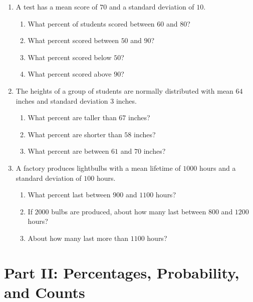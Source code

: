 \documentclass[11pt]{article}
\newcommand{\answerline}{\vspace{1.2cm}}
\begin{document}
\begin{enumerate}[leftmargin=*, label=\textbf{\arabic*.}]

\item A test has a mean score of $70$ and a standard deviation of $10$.
\begin{enumerate}[label=(\alph*)]
    \item What percent of students scored between $60$ and $80$? \answerline
    \item What percent scored between $50$ and $90$? \answerline
    \item What percent scored below $50$? \answerline
    \item What percent scored above $90$? \answerline
\end{enumerate}

\item The heights of a group of students are normally distributed with mean $64$ inches and standard deviation $3$ inches.
\begin{enumerate}[label=(\alph*)]
    \item What percent are taller than $67$ inches? \answerline
    \item What percent are shorter than $58$ inches? \answerline
    \item What percent are between $61$ and $70$ inches? \answerline
\end{enumerate}

\item A factory produces lightbulbs with a mean lifetime of $1000$ hours and a standard deviation of $100$ hours.
\begin{enumerate}[label=(\alph*)]
    \item What percent last between $900$ and $1100$ hours? \answerline
    \item If $2000$ bulbs are produced, about how many last between $800$ and $1200$ hours? \answerline
    \item About how many last more than $1100$ hours? \answerline
\end{enumerate}

\end{enumerate}

\section{Part II: Percentages, Probability, and Counts}
\end{document}
